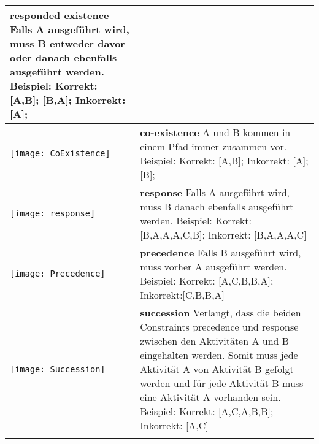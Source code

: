 \begin{longtable}{|p{}|p{}|}
\textbf{responded existence} \newline  Falls A ausgeführt wird, muss B entweder davor oder danach ebenfalls ausgeführt werden. \newline
Beispiel: Korrekt: [A,B]; [B,A]; Inkorrekt:[A];\\
\hline
\begin{center}

  \texttt{[image: CoExistence]} %
    \end{center} &
\textbf{co-existence} \newline A und B kommen in einem Pfad immer zusammen vor.\newline
Beispiel: Korrekt: [A,B]; Inkorrekt: [A]; [B];
 \\
\hline

\begin{center}

  \texttt{[image: response]} %
    \end{center} &
\textbf{response} \newline Falls A ausgeführt wird, muss B danach ebenfalls ausgeführt werden. \newline
Beispiel: Korrekt: [B,A,A,A,C,B]; Inkorrekt: [B,A,A,A,C]
\\
\hline
\begin{center}

  \texttt{[image: Precedence]} %
    \end{center} &
    \textbf{precedence}\newline
Falls B  ausgeführt wird, muss vorher A ausgeführt werden. \newline
Beispiel: Korrekt: [A,C,B,B,A]; Inkorrekt:[C,B,B,A]
\\
\hline
\begin{center}

  \texttt{[image: Succession]} %
    \end{center}&
\textbf{succession} \newline Verlangt, dass die beiden Constraints precedence und response zwischen den Aktivitäten A und B eingehalten werden. Somit muss jede Aktivität A von Aktivität B gefolgt werden und für jede Aktivität B muss eine Aktivität A vorhanden sein. \newline
Beispiel: Korrekt: [A,C,A,B,B]; Inkorrekt: [A,C]\\

\hline

 \begin{center}


\end{center}
\end{longtable}
